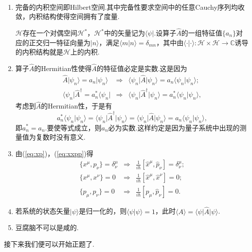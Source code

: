 		\begin{remark}\ 
			\begin{enumerate}
				\item 完备的内积空间即Hilbert空间.其中完备性要求空间中的任意Cauchy序列均收敛，内积结构使得空间拥有了度量.
				
				$\mathcal{H}$存在一个对偶空间$\mathcal{H}^*$，$\mathcal{H}^*$中的矢量记为$\langle\psi\vert$.设算子$\hat{A}$的一组特征值$\{a_n\}$对应的正交归一特征向量为$\vert n\rangle $，满足$\langle m\vert n\rangle=\delta_{mn}$，其中由$\langle\cdot \vert\cdot\rangle:\mathcal{H}\times \mathcal{H}\rightarrow \mathbb{C} $诱导的内积结构就是$\mathcal{H}$上的内积.
				\item 算子$\hat{A}$的Hermitian性使得$\hat{A}$的特征值必定是实数.这是因为
				\begin{eqnarray*}
					\hat{A}\vert\psi_n\rangle=a_n\vert\psi_n\rangle&\Rightarrow&\langle\psi_n\vert\hat{A}\vert\psi_n\rangle=a_n\langle\psi_n\vert\psi_n\rangle;\\
					\langle\psi_n\vert\hat{A}^\dagger=a^*_n\langle\psi_n\vert&\Rightarrow&\langle\psi_n\vert\hat{A}^\dagger\vert\psi_n\rangle=a^*_n\langle\psi_n\vert\psi_n\rangle,
				\end{eqnarray*}
				考虑到$\hat{A}$的Hermitian性，于是有
				$$a^*_n\langle\psi_n\vert\psi_n\rangle=\langle\psi_n\vert\hat{A}^\dagger\vert\psi_n\rangle=\langle\psi_n\vert\hat{A}\vert\psi_n\rangle=a_n\langle\psi_n\vert\psi_n\rangle,$$
				即$a^*_n=a_n$.要使等式成立，则$a_n$必为实数.这样约定是因为量子系统中出现的测量值为复数时没有意义.
				\item 由(\ref{eq:xp})，(\ref{eq:xxpp})得
				\begin{eqnarray*}
					\{x^\mu,p_\nu\}=\delta^\mu_\nu&\Rightarrow&\frac{1}{i\hbar}[\hat{x}^\mu,\hat{p}_\nu]=\delta^\mu_\nu;\\
					\{x^\mu,x^\nu\}=0&\Rightarrow&\frac{1}{i\hbar}[\hat{x}^\mu,\hat{x}^\nu]=0;\\
					\{p_\mu,p_\nu\}=0&\Rightarrow&\frac{1}{i\hbar}[\hat{p}_\mu,\hat{p}_\nu]=0.
				\end{eqnarray*}
				\item 若系统的状态矢量$\vert\psi\rangle$是归一化的，则$\langle\psi\vert\psi\rangle=1$，此时$\langle A\rangle =\langle\psi\vert\hat{A}\vert\psi\rangle$.
				\item 豆腐脑不可以是咸的.
			\end{enumerate}
		\end{remark}

		接下来我们便可以开始正题了.
